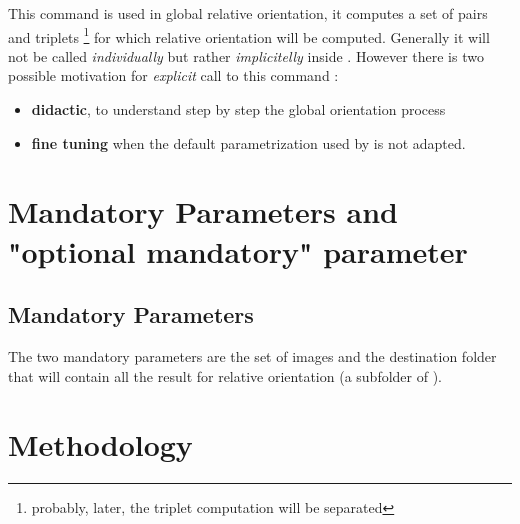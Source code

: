 \documentclass[a4paper]{article}
\begin{document}
\CmdTitle

\tableofcontents



\SecDescr

This command is used in global relative orientation, it computes a set of pairs  and triplets
\footnote{probably, later, the triplet computation will be separated} for which relative orientation
will be computed.
Generally it will not be called \emph{individually} but rather \emph{implicitelly} inside .
However  there is two possible motivation for \emph{explicit} call to this command :

\begin{itemize}
   \item {\bf didactic}, to understand step by step the global orientation process
   \item {\bf fine tuning } when the default parametrization used by 
         is not adapted.
\end{itemize}




\section{Mandatory Parameters and "optional mandatory" parameter}

\subsection{Mandatory Parameters}

The two mandatory parameters are the set of images and the destination 
folder that will contain all the result for relative orientation
(a subfolder of ).




\section{Methodology}
\end{document}
